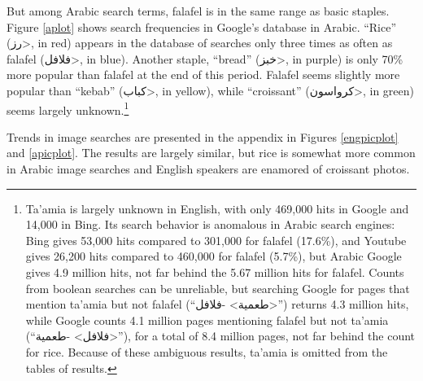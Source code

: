 \documentclass[a4paper,10pt]{article}
\begin{document}
But among Arabic search terms, falafel is in the same range as basic staples. 
Figure \ref{aplot} shows search frequencies in Google's database in Arabic.
``Rice'' (\<رز>, in red) appears in the database of searches only three times as often as
falafel (\<فلافل>, in blue).  Another staple, ``bread'' (\<خبز>, in purple) is only 70\% more
popular than falafel at the end of this period. Falafel seems slightly more popular than ``kebab'' (\<كباب>,
in yellow), while ``croissant'' (\<كرواسون>, in green) seems largely unknown.\footnote{
Ta'amia is largely unknown in English, with only 469,000 hits in Google and 14,000 in Bing.
Its search behavior is anomalous in Arabic search engines: Bing gives 53,000 hits compared
to 301,000 for falafel (17.6\%), and Youtube gives 26,200 hits compared to 460,000 for falafel (5.7\%), but
Arabic Google gives 4.9 million hits, not far behind the 5.67 million hits for falafel.
Counts from boolean searches can be unreliable, but searching Google for pages that mention ta'amia but not falafel
(``\<طعمية> -\<فلافل>'')
returns 4.3 million hits, while Google counts 4.1 million pages mentioning falafel but not ta'amia
(``\<فلافل> -\<طعمية>''), for a total of 8.4 million pages, not far behind the count for rice.
Because of these ambiguous results, ta'amia is omitted from the tables of results.
}

Trends in image searches are presented in the appendix in Figures \ref{engpicplot} and \ref{apicplot}.
The results are largely similar, but rice is somewhat more common in Arabic image searches
and English speakers are enamored of croissant photos.
\end{document}
